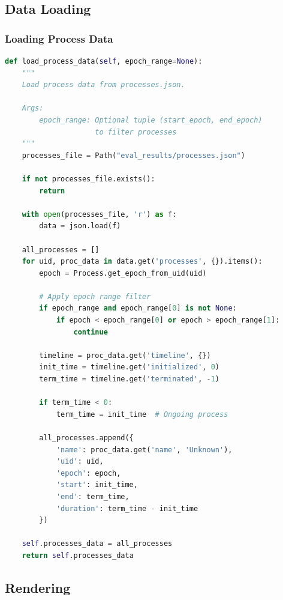 \documentclass[11pt,a4paper]{article}
\begin{document}
\subsection{Data Loading}

\subsubsection{Loading Process Data}

\begin{lstlisting}[language=Python]
def load_process_data(self, epoch_range=None):
    """
    Load process data from processes.json.
    
    Args:
        epoch_range: Optional tuple (start_epoch, end_epoch)
                     to filter processes
    """
    processes_file = Path("eval_results/processes.json")
    
    if not processes_file.exists():
        return
    
    with open(processes_file, 'r') as f:
        data = json.load(f)
    
    all_processes = []
    for uid, proc_data in data.get('processes', {}).items():
        epoch = Process.get_epoch_from_uid(uid)
        
        # Apply epoch range filter
        if epoch_range and epoch_range[0] is not None:
            if epoch < epoch_range[0] or epoch > epoch_range[1]:
                continue
        
        timeline = proc_data.get('timeline', {})
        init_time = timeline.get('initialized', 0)
        term_time = timeline.get('terminated', -1)
        
        if term_time < 0:
            term_time = init_time  # Ongoing process
        
        all_processes.append({
            'name': proc_data.get('name', 'Unknown'),
            'uid': uid,
            'epoch': epoch,
            'start': init_time,
            'end': term_time,
            'duration': term_time - init_time
        })
    
    self.processes_data = all_processes
    return self.processes_data
\end{lstlisting}

\subsection{Rendering}
\end{document}

